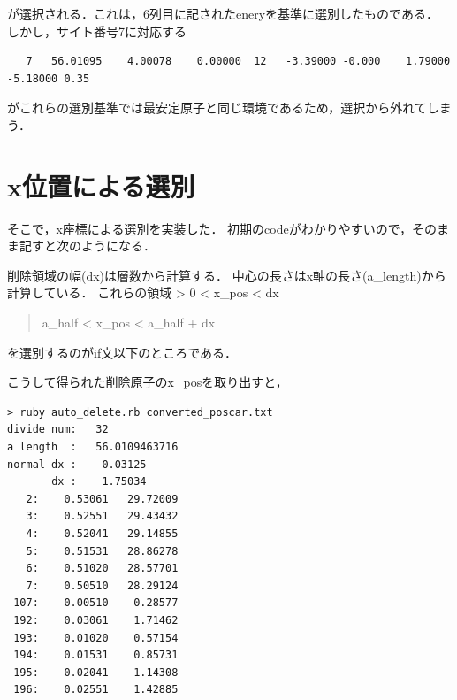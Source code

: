 が選択される．これは，6列目に記されたeneryを基準に選別したものである．
しかし，サイト番号7に対応する

\begin{verbatim}
   7   56.01095    4.00078    0.00000  12   -3.39000 -0.000    1.79000   -5.18000 0.35
\end{verbatim}

がこれらの選別基準では最安定原子と同じ環境であるため，選択から外れてしまう．

    \section{x位置による選別}\label{xux4f4dux7f6eux306bux3088ux308bux9078ux5225}

そこで，x座標による選別を実装した．
初期のcodeがわかりやすいので，そのまま記すと次のようになる．

\begin{Shaded}
\end{Shaded}

削除領域の幅(dx)は層数から計算する．
中心の長さはx軸の長さ(a\_length)から計算している． これらの領域
\textgreater{} 0 \textless{} x\_pos \textless{} dx

\begin{quote}
a\_half \textless{} x\_pos \textless{} a\_half + dx
\end{quote}
を選別するのがif文以下のところである．

こうして得られた削除原子のx\_posを取り出すと，

\begin{verbatim}
> ruby auto_delete.rb converted_poscar.txt 
divide num:   32
a length  :   56.0109463716
normal dx :    0.03125
       dx :    1.75034
   2:    0.53061   29.72009
   3:    0.52551   29.43432
   4:    0.52041   29.14855
   5:    0.51531   28.86278
   6:    0.51020   28.57701
   7:    0.50510   28.29124
 107:    0.00510    0.28577
 192:    0.03061    1.71462
 193:    0.01020    0.57154
 194:    0.01531    0.85731
 195:    0.02041    1.14308
 196:    0.02551    1.42885
\end{verbatim}

